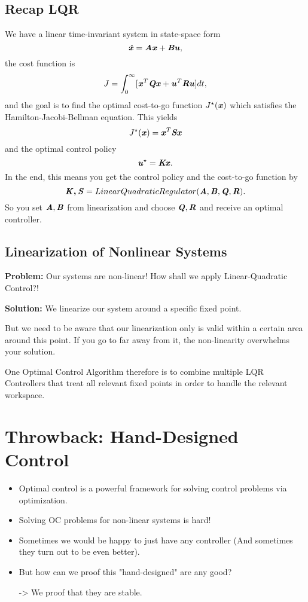 \subsection{Recap LQR}
We have a linear time-invariant system in state-space form
\begin{equation*} 
\bm{\mathit{\dot{x}}}=\bm{\mathit{Ax}}+\bm{\mathit{Bu}},
\end{equation*}
the cost function is 
\begin{equation*} 
J = \int_0^{\infty}[\bm{\mathit{x}}^T\bm{\mathit{Qx}}+\bm{\mathit{u}}	^T\bm{\mathit{Ru}}]dt,
\end{equation*}
and the goal is to find the optimal cost-to-go function $J^\star(\bm{\mathit{x}})$ which satisfies the Hamilton-Jacobi-Bellman equation.
This yields 
\begin{equation*} 
J^\star(\bm{\mathit{x}}) = \bm{\mathit{x}}^T\bm{\mathit{Sx}}
\end{equation*}
and the optimal control policy 
\begin{equation*} 
\bm{\mathit{u}}^\star=\bm{\mathit{Kx}}.
\end{equation*}
In the end, this means you get the control policy and the cost-to-go function by
\begin{equation*} 
\bm{\mathit{K,S}}=LinearQuadraticRegulator(\bm{\mathit{A}}, \bm{\mathit{B}}, \bm{\mathit{Q}}, \bm{\mathit{R}}).
\end{equation*}
So you set $\bm{\mathit{A}}, \bm{\mathit{B}}$ from linearization and choose $\bm{\mathit{Q}}, \bm{\mathit{R}}$ and receive an optimal controller.

\subsection{Linearization of Nonlinear Systems}
\textbf{Problem:} Our systems are non-linear! How shall we apply Linear-Quadratic Control?!

\textbf{Solution:} We linearize our system around a specific fixed point.

But we need to be aware that our linearization only is valid within a certain area around this point. If you go to far away from it, the non-linearity overwhelms your solution. 

One Optimal Control Algorithm therefore is to combine multiple LQR Controllers that treat all relevant fixed points in order to handle the relevant workspace. 

\section{Throwback: Hand-Designed Control}
\begin{itemize}
\item Optimal control is a powerful framework for solving control problems via optimization.
\item Solving OC problems for non-linear systems is hard!
\item Sometimes we would be happy to just have any controller (And sometimes they turn out to be even better).
\item But how can we proof this "hand-designed" are any good? 

-> We proof that they are stable. 
\end{itemize}

